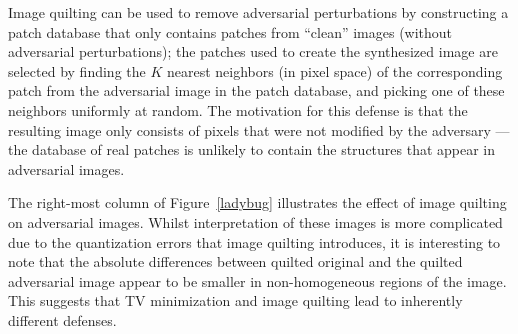 Image quilting can be used to remove adversarial perturbations by constructing a patch database that only contains patches from ``clean'' images (without adversarial perturbations); the patches used to create the synthesized image are selected by finding the $K$ nearest neighbors (in pixel space) of the corresponding patch from the adversarial image in the patch database, and picking one of these neighbors uniformly at random. The motivation for this defense is that the resulting image only consists of pixels that were not modified by the adversary --- the database of real patches is unlikely to contain the structures that appear in adversarial images.

The right-most column of Figure~\ref{ladybug} illustrates the effect of image quilting on adversarial images. Whilst interpretation of these images is more complicated due to the quantization errors that image quilting introduces, it is interesting to note that the absolute differences between quilted original and the quilted adversarial image appear to be smaller in non-homogeneous regions of the image. This suggests that TV minimization and image quilting lead to inherently different defenses.

